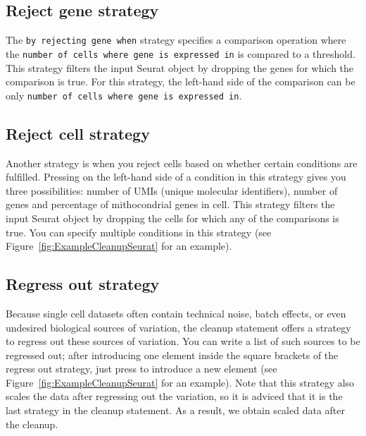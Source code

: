 \subsection{Reject gene strategy}
The \texttt{by rejecting gene when} strategy specifies a comparison operation where the
\texttt{number of cells where gene is expressed in} is compared to a threshold.
This strategy filters the input Seurat object by dropping the genes for which
the comparison is true. For this strategy, the left-hand side of the comparison can be
only \texttt{number of cells where gene is expressed in}.

\subsection{Reject cell strategy}
Another strategy is when you reject cells based on whether certain conditions are fulfilled.
Pressing \keys{\ctrl+\space} on the left-hand side of a condition in this strategy gives you
three possibilities: number of UMIs (unique molecular identifiers), number of genes and
percentage of mithocondrial genes in cell. This strategy filters the input Seurat object
by dropping the cells for which any of the comparisons is true. You can specify multiple
conditions in this strategy (see Figure~\ref{fig:ExampleCleanupSeurat} for an example).

\subsection{Regress out strategy}
Because single cell datasets often contain technical noise, batch effects, or even undesired
biological sources of variation, the cleanup statement offers a strategy to regress out
these sources of variation. You can write a list of such sources to be regressed out;
after introducing one element inside the square brackets of the regress out strategy, just
press \keys{\return} to introduce a new element (see Figure~\ref{fig:ExampleCleanupSeurat}
for an example). Note that this strategy also scales the data after regressing out the
variation, so it is adviced that it is the last strategy in the cleanup statement. As a result,
we obtain scaled data after the cleanup.

